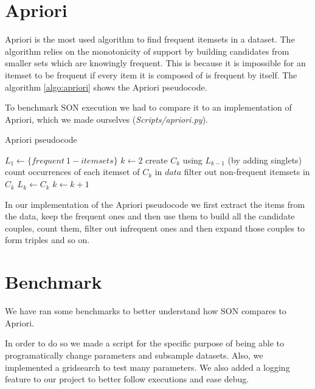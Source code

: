 \documentclass[a4paper]{article}
\begin{document}
	\newpage
	
	\section{Apriori}
	\label{section:apriori}
	
	Apriori is the most used algorithm to find frequent itemsets in a dataset. The algorithm relies on the monotonicity of support by building candidates from smaller sets which are knowingly frequent. This is because it is impossible for an itemset to be frequent if every item it is composed of is frequent by itself. The algorithm \ref{algo:apriori} shows the Apriori pseudocode.
	
	To benchmark SON execution we had to compare it to an implementation of Apriori, which we made ourselves (\textit{Scripts/apriori.py}).
	
\begin{algorithm}
\caption{Apriori pseudocode}
\label{algo:apriori}
\begin{algorithmic}[1]
	\State $L_1 \gets \{frequent \ 1-itemsets\}$ 
    	\State $k \gets 2$
    		\State create $C_k$ using $L_{k-1}$ (by adding singlets) 
    		\State count occurrences of each itemset of $C_k$ in $data$
    		\State filter out non-frequent itemsets in $C_k$
    		\State $L_k \gets C_k$
    		\State $k \gets k+1$
    	\EndWhile
\EndFunction
\end{algorithmic}
\end{algorithm}

    In our implementation of the Apriori pseudocode we first extract the items from the data, keep the frequent ones and then use them to build all the candidate couples, count them, filter out infrequent ones and then expand those couples to form triples and so on.
	
	\section{Benchmark}
	We have ran some benchmarks to better understand how SON compares to Apriori.
	
	In order to do so we made a script for the specific purpose of being able to programatically change parameters and 	subsample datasets.
	Also, we implemented a gridsearch to test many parameters. We also added a logging feature to our project to better follow executions and ease debug.
	
\end{document}
